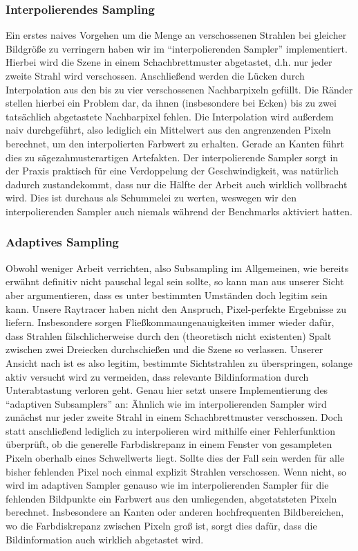 \subsubsection{Interpolierendes Sampling}
Ein erstes naives Vorgehen um die Menge an verschossenen Strahlen bei gleicher Bildgröße zu verringern haben wir im "`interpolierenden Sampler"' implementiert.
Hierbei wird die Szene in einem Schachbrettmuster abgetastet, d.h. nur jeder zweite Strahl wird verschossen.
Anschließend werden die Lücken durch Interpolation aus den bis zu vier verschossenen Nachbarpixeln gefüllt.
Die Ränder stellen hierbei ein Problem dar, da ihnen (insbesondere bei Ecken) bis zu zwei tatsächlich abgetastete Nachbarpixel fehlen.
Die Interpolation wird außerdem naiv durchgeführt, also lediglich ein Mittelwert aus den angrenzenden Pixeln berechnet, um den interpolierten Farbwert zu erhalten.
Gerade an Kanten führt dies zu sägezahmusterartigen Artefakten.
Der interpolierende Sampler sorgt in der Praxis praktisch für eine Verdoppelung der Geschwindigkeit, was natürlich dadurch zustandekommt, dass nur die Hälfte der Arbeit auch wirklich vollbracht wird.
Dies ist durchaus als Schummelei zu werten, weswegen wir den interpolierenden Sampler auch niemals während der Benchmarks aktiviert hatten.

\subsubsection{Adaptives Sampling}
Obwohl weniger Arbeit verrichten, also Subsampling im Allgemeinen, wie bereits erwähnt definitiv nicht pauschal legal sein sollte, so kann man aus unserer Sicht aber argumentieren, dass es unter bestimmten Umständen doch legitim sein kann.
Unsere Raytracer haben nicht den Anspruch, Pixel-perfekte Ergebnisse zu liefern.
Insbesondere sorgen Fließkommaungenauigkeiten immer wieder dafür, dass Strahlen fälschlicherweise durch den (theoretisch nicht existenten) Spalt zwischen zwei Dreiecken durchschießen und die Szene so verlassen.
Unserer Ansicht nach ist es also legitim, bestimmte Sichtstrahlen zu überspringen, solange aktiv versucht wird zu vermeiden, dass relevante Bildinformation durch Unterabtastung verloren geht.
Genau hier setzt unsere Implementierung des "`adaptiven Subsamplers"' an:
Ähnlich wie im interpolierenden Sampler wird zunächst nur jeder zweite Strahl in einem Schachbrettmuster verschossen.
Doch statt anschließend lediglich zu interpolieren wird mithilfe einer Fehlerfunktion überprüft, ob die generelle Farbdiskrepanz in einem Fenster von gesampleten Pixeln oberhalb eines Schwellwerts liegt.
Sollte dies der Fall sein werden für alle bisher fehlenden Pixel noch einmal explizit Strahlen verschossen.
Wenn nicht, so wird im adaptiven Sampler genauso wie im interpolierenden Sampler für die fehlenden Bildpunkte ein Farbwert aus den umliegenden, abgetatsteten Pixeln berechnet.
Insbesondere an Kanten oder anderen hochfrequenten Bildbereichen, wo die Farbdiskrepanz zwischen Pixeln groß ist, sorgt dies dafür, dass die Bildinformation auch wirklich abgetastet wird.

